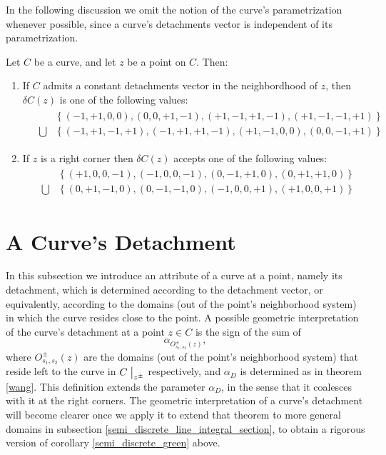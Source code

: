 \documentclass[11pt]{book}
\begin{document}
In the following discussion we omit the notion of the curve's parametrization whenever possible, since a curve's detachments vector is independent of its parametrization.

\begin{remark}\label{curve_detachment_vector_possible_values}Let $C$ be a curve, and let $z$ be a point on $C$. Then:
\begin{enumerate}
\item If $C$ admits a constant detachments vector in the neighbordhood
of $z$, then $\delta C\left(z\right)$ is one of the following values:
\begin{align}
&\begin{aligned}
 & \left\{ \left(-1,+1,0,0\right),\left(0,0,+1,-1\right),\left(+1,-1,+1,-1\right),\left(+1,-1,-1,+1\right)\right\} \\
\bigcup & \left\{ \left(-1,+1,-1,+1\right),\left(-1,+1,+1,-1\right),\left(+1,-1,0,0\right),\left(0,0,-1,+1\right)\right\} 
\end{aligned}
\end{align}
\item If $z$ is a right corner then $\delta C\left(z\right)$ accepts one
of the following values:
\begin{align}
&\begin{aligned}
 & \left\{ \left(+1,0,0,-1\right),\left(-1,0,0,-1\right),\left(0,-1,+1,0\right),\left(0,+1,+1,0\right)\right\} \\
\bigcup & \left\{ \left(0,+1,-1,0\right),\left(0,-1,-1,0\right),\left(-1,0,0,+1\right),\left(+1,0,0,+1\right)\right\} 
\end{aligned}
\end{align}
\end{enumerate}
\end{remark}

\section{A Curve's Detachment}In this subsection we introduce an attribute of a curve at a point, namely its detachment, which is determined according to the detachment vector, or equivalently, according to the domains (out of the point's neighborhood system) in which the curve resides close to the point.
A possible geometric interpretation of the curve's detachment at a point $z\in C$ is the sign of the sum of
\[
\alpha_{O_{s_{1},s_{2}}^{\pm}\left(z\right)},
\]
where $O_{s_{1},s_{2}}^{\pm}\left(z\right)$ are the domains (out
of the point's neighborhood system) that reside left to the curve in $C\bigm\lvert_{z^{\pm}}$ respectively, and $\alpha_{D}$
is determined as in theorem \ref{wang}. This definition extends the parameter
$\alpha_{D}$, in the sense that it coalesces with it at the right corners.
The geometric interpretation of a curve's detachment will become clearer once we apply it to extend that theorem to more general domains in subsection \ref{semi_discrete_line_integral_section}, to obtain a rigorous version of corollary \ref{semi_discrete_green} above.
\end{document}
